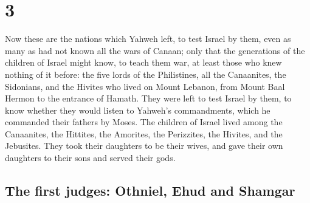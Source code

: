 \hypertarget{section-2}{%
\section{3}\label{section-2}}

 Now these are the nations which Yahweh left, to test
Israel by them, even as many as had not known all the wars of Canaan;
 only that the generations of the children of Israel might
know, to teach them war, at least those who knew nothing of it before:
 the five lords of the Philistines, all the Canaanites,
the Sidonians, and the Hivites who lived on Mount Lebanon, from Mount
Baal Hermon to the entrance of Hamath.  They were left to
test Israel by them, to know whether they would listen to Yahweh's
commandments, which he commanded their fathers by Moses. 
The children of Israel lived among the Canaanites, the Hittites, the
Amorites, the Perizzites, the Hivites, and the Jebusites. 
They took their daughters to be their wives, and gave their own
daughters to their sons and served their gods.

\hypertarget{the-first-judges-othniel-ehud-and-shamgar}{%
\subsection{The first judges: Othniel, Ehud and
Shamgar}\label{the-first-judges-othniel-ehud-and-shamgar}}

